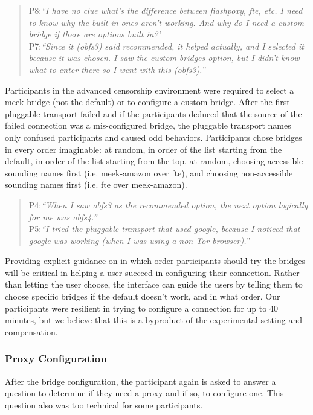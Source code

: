 \documentclass[USenglish,oneside,twocolumn]{article}
\begin{document}
\begin{quotation} 
\noindent P8:\textit{``I have no clue what's the difference between flashpoxy, fte, etc. I need to know why the built-in ones aren't working. And why do I need a custom bridge if there are options built in?'}\\

\noindent P7:\textit{``Since it (obfs3) said recommended, it helped actually, and I selected it because it was chosen. I saw the custom bridges option, but I didn't know what to enter there so I went with this (obfs3).''}
\end{quotation} 

Participants in the advanced censorship environment were required to select a meek bridge (not the default) or to configure a custom bridge. After the first pluggable transport failed and if the participants deduced that the source of the failed connection was a mis-configured bridge, the pluggable transport names only confused participants and caused odd behaviors. Participants chose bridges in every order imaginable: at random, in order of the list starting from the default, in order of the list starting from the top, at random, choosing accessible sounding names first (i.e. meek-amazon over fte), and choosing non-accessible sounding names first (i.e. fte over meek-amazon). 

\begin{quotation}
\noindent P4:\textit{``When I saw obfs3 as the recommended option, the next option logically for me was obfs4.''}\\

\noindent P5:\textit{``I tried the pluggable transport that used google, because I noticed that google was working (when I was using a non-Tor browser).''}
\end{quotation} 

Providing explicit guidance on in which order participants should try the bridges will be critical in helping a user succeed in configuring their connection. Rather than letting the user choose, the interface can guide the users by telling them to choose specific bridges if the default doesn't work, and in what order. Our participants were resilient in trying to configure a connection for up to 40 minutes, but we believe that this is a byproduct of the experimental setting and compensation. \\

\subsubsection{Proxy Configuration} 
After the bridge configuration, the participant again is asked to answer a question to determine if they need a proxy and if so, to configure one. This question also was too technical for some participants.
\end{document}
